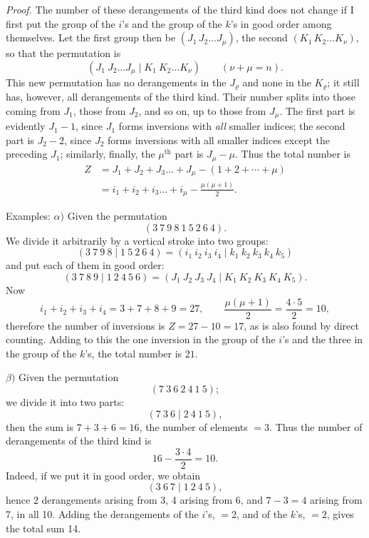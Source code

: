 \documentclass[10pt]{article}
\begin{document}
\emph{Proof.} The number of these derangements of the third kind does not change if I first put the group of the \(i\)'s and the group of the \(k\)'s in good order among themselves. Let the first group then be \((J_1\,J_2\ldots J_\mu)\), the second \((K_1\,K_2\ldots K_\nu)\), so that the permutation is
\[
(J_1\ J_2\ldots J_\mu\mid K_1\ K_2\ldots K_\nu)\qquad(\nu+\mu=n).
\]
This new permutation has no derangements in the \(J_\varrho\) and none in the \(K_\varrho\); it still has, however, all derangements of the third kind. Their number splits into those coming from \(J_1\), those from \(J_2\), and so on, up to those from \(J_\mu\). The first part is evidently \(J_1-1\), since \(J_1\) forms inversions with \emph{all} smaller indices; the second part is \(J_2-2\), since \(J_2\) forms inversions with all smaller indices except the preceding \(J_1\); similarly, finally, the \(\mu^{\mathrm{th}}\) part is \(J_\mu-\mu\). Thus the total number is
\[
\begin{aligned}
Z&=J_1+J_2+J_3\ldots+J_\mu-(1+2+\cdots+\mu)\\
&=i_1+i_2+i_3\ldots+i_\mu-\frac{\mu(\mu+1)}{2}.
\end{aligned}
\]

Examples: \(\alpha)\) Given the permutation
\[
(3\ 7\ 9\ 8\ 1\ 5\ 2\ 6\ 4).
\]
We divide it arbitrarily by a vertical stroke into two groups:
\[
(3\ 7\ 9\ 8\mid1\ 5\ 2\ 6\ 4)=(i_1\ i_2\ i_3\ i_4\mid k_1\ k_2\ k_3\ k_4\ k_5)
\]
and put each of them in good order:
\[
(3\ 7\ 8\ 9\mid1\ 2\ 4\ 5\ 6)=(J_1\ J_2\ J_3\ J_4\mid K_1\ K_2\ K_3\ K_4\ K_5).
\]
Now
\[
i_1+i_2+i_3+i_4=3+7+8+9=27,\qquad
\frac{\mu(\mu+1)}{2}=\frac{4\cdot5}{2}=10,
\]
therefore the number of inversions is \(Z=27-10=17\), as is also found by direct counting. Adding to this the one inversion in the group of the \(i\)'s and the three in the group of the \(k\)'s, the total number is \(21\).

\(\beta)\) Given the permutation
\[
(7\ 3\ 6\ 2\ 4\ 1\ 5);
\]
we divide it into two parts:
\[
(7\ 3\ 6\mid2\ 4\ 1\ 5),
\]
then the sum is \(7+3+6=16\), the number of elements \(=3\). Thus the number of derangements of the third kind is
\[
16-\frac{3\cdot4}{2}=10.
\]
Indeed, if we put it in good order, we obtain
\[
(3\ 6\ 7\mid1\ 2\ 4\ 5),
\]
hence 2 derangements arising from 3, 4 arising from 6, and \(7-3=4\) arising from 7, in all 10. Adding the derangements of the \(i\)'s, \(=2\), and of the \(k\)'s, \(=2\), gives the total sum 14.
\end{document}
